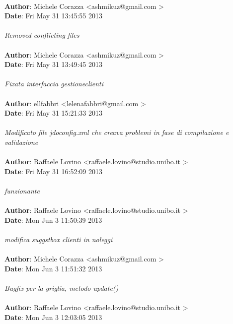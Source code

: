 \documentclass[a4paper,12pt]{article} %
\begin{document}
\\
\textbf{Author}: Michele Corazza \textless ashmikuz@gmail.com \textgreater \\
\textbf{Date}:   Fri May 31 13:45:55 2013 \\
\\
    \emph{Removed conflicting files}\\
\\
\textbf{Author}: Michele Corazza \textless ashmikuz@gmail.com \textgreater \\
\textbf{Date}:   Fri May 31 13:49:45 2013 \\
\\
    \emph{Fixata interfaccia gestioneclienti}\\
\\
\textbf{Author}: ellfabbri \textless lelenafabbri@gmail.com \textgreater \\
\textbf{Date}:   Fri May 31 15:21:33 2013 \\
\\
    \emph{Modificato file jdoconfig.xml che creava problemi in fase di
    compilazione e validazione}\\
\\
\textbf{Author}: Raffaele Lovino \textless raffaele.lovino@studio.unibo.it \textgreater \\
\textbf{Date}:   Fri May 31 16:52:09 2013 \\
\\
    \emph{funzionante}\\
\\
\textbf{Author}: Raffaele Lovino \textless raffaele.lovino@studio.unibo.it \textgreater \\
\textbf{Date}:   Mon Jun 3 11:50:39 2013 \\
\\
    \emph{modifica suggstbox clienti in noleggi}\\
\\
\textbf{Author}: Michele Corazza \textless ashmikuz@gmail.com \textgreater \\
\textbf{Date}:   Mon Jun 3 11:51:32 2013 \\
\\
    \emph{Bugfix per la griglia, metodo update()}\\
\\
\textbf{Author}: Raffaele Lovino \textless raffaele.lovino@studio.unibo.it \textgreater \\
\textbf{Date}:   Mon Jun 3 12:03:05 2013 \\
\\
\end{document}
